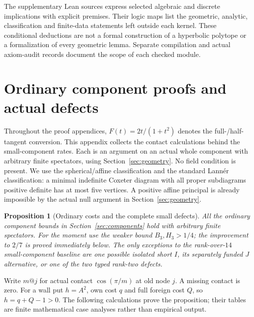 \documentclass[11pt]{article}
\newtheorem{proposition}[theorem]{Proposition}
\theoremstyle{definition}
\theoremstyle{remark}
\begin{document}
The supplementary Lean sources express selected algebraic and
discrete implications with explicit premises. Their logic maps list
the geometric, analytic, classification and finite-data statements
left outside each kernel. These conditional deductions are not a
formal construction of a hyperbolic polytope or a formalization of
every geometric lemma. Separate compilation and actual axiom-audit
records document the scope of each checked module.

\appendix

\section{Ordinary component proofs and actual defects}
\label{app:ordinary}
Throughout the proof appendices, \(F(t)=2t/(1+t^2)\) denotes
the full-/half-tangent conversion.
This appendix collects the contact calculations behind the small-component
rates. Each is an argument on an actual whole component with arbitrary
finite spectators, using Section~\ref{sec:geometry}. No field condition
is present. We use the spherical/affine classification and the standard
Lann\'er classification: a minimal indefinite Coxeter diagram with all
proper subdiagrams positive definite has at most five vertices.
A positive affine principal is already impossible by the actual null
argument in Section~\ref{sec:geometry}.

\begin{proposition}[Ordinary costs and the complete small defects]
\label{app:prop:ordinary}
All the ordinary component bounds in Section~\ref{sec:components}
hold with arbitrary finite spectators. For the moment use the weaker
bound \(B_3,H_3>1/4\); the improvement to \(2/7\) is proved immediately
below. The only exceptions to the rank-over-\(14\) small-component
baseline are one possible isolated short \(I\), its separately funded
\(J\) alternative, or one of the two typed rank-two defects.
\end{proposition}
Write \(m@j\) for actual contact \(\cos(\pi/m)\) at old node \(j\).
A missing contact is zero. For a wall put \(h=A^2\), own cost
\(q\) and full foreign cost \(Q\), so \(h=q+Q-1>0\).
The following calculations prove the proposition; their tables are
finite mathematical case analyses rather than empirical output.
\end{document}
